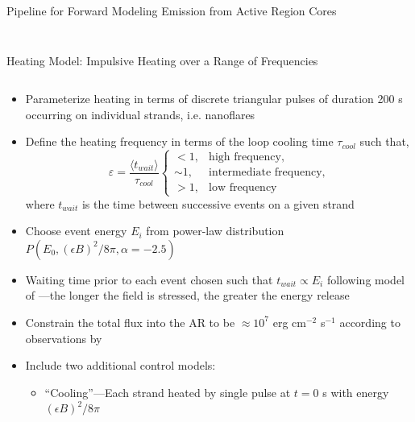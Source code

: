 \documentclass[final,12pt]{beamer}
\begin{document}
\begin{frame}
\begin{columns}[T]
\begin{column}{0.49\linewidth}
\begin{block}{Pipeline for Forward Modeling Emission from Active Region Cores}
\begin{columns}[c]
\begin{column}{0.65\columnwidth}
\begin{enumerate}
        \end{enumerate}
      \end{column}
      \end{columns}
    \end{block}
    \begin{block}{Heating Model: Impulsive Heating over a Range of Frequencies}
      \vspace{-2ex}
      \begin{columns}[c]
        \begin{column}{0.5\columnwidth}
          \begin{itemize}
            \item Parameterize heating in terms of \alert{discrete triangular pulses of duration 200 s} occurring on individual strands, i.e. nanoflares \citep{parker_nanoflares_1988}
            \item Define the heating frequency in terms of the loop cooling time $\tau_{cool}$ such that,
            \begin{equation*}
              \varepsilon = \frac{\langle t_{wait}\rangle}{\tau_{cool}}\begin{cases} 
                < 1, & \text{high frequency}, \\
                \sim1, & \text{intermediate frequency}, \\
                >1, & \text{low frequency}
             \end{cases}
            \end{equation*}
            where $t_{wait}$ is the time between successive events on a given strand
            \item Choose event energy $E_i$ from power-law distribution $P(E_0,(\epsilon B)^2/8\pi,\alpha=-2.5)$
            \item Waiting time prior to each event chosen such that $t_{wait}\propto E_i$ following model of \citet{cargill_active_2014}---the longer the field is stressed, the greater the energy release
            \item Constrain the total flux into the AR to be $\approx10^7$ erg cm$^{-2}$ s$^{-1}$ according to observations by \citet{withbroe_mass_1977}
            \item Include two additional control models:
            \begin{itemize}
              \item ``Cooling''---Each strand heated by single pulse at $t=0$ s with energy $(\epsilon B)^2/8\pi$

\end{itemize}
\end{itemize}
\end{column}
\end{columns}
\end{block}
\end{column}
\end{columns}
\end{frame}
\end{document}
